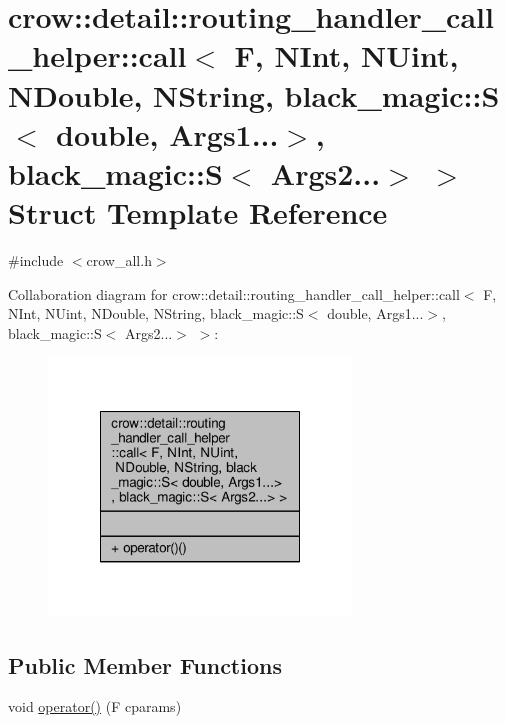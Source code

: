 \hypertarget{structcrow_1_1detail_1_1routing__handler__call__helper_1_1call_3_01_f_00_01_n_int_00_01_n_uint_0b30fc35e23f441513a63571edf36fc02}{\section{crow\-:\-:detail\-:\-:routing\-\_\-handler\-\_\-call\-\_\-helper\-:\-:call$<$ F, N\-Int, N\-Uint, N\-Double, N\-String, black\-\_\-magic\-:\-:S$<$ double, Args1...$>$, black\-\_\-magic\-:\-:S$<$ Args2...$>$ $>$ Struct Template Reference}
\label{structcrow_1_1detail_1_1routing__handler__call__helper_1_1call_3_01_f_00_01_n_int_00_01_n_uint_0b30fc35e23f441513a63571edf36fc02}
}


{\ttfamily \#include $<$crow\-\_\-all.\-h$>$}



Collaboration diagram for crow\-:\-:detail\-:\-:routing\-\_\-handler\-\_\-call\-\_\-helper\-:\-:call$<$ F, N\-Int, N\-Uint, N\-Double, N\-String, black\-\_\-magic\-:\-:S$<$ double, Args1...$>$, black\-\_\-magic\-:\-:S$<$ Args2...$>$ $>$\-:
\nopagebreak
\begin{figure}[H]
\begin{center}
\leavevmode
\includegraphics[width=228pt]{structcrow_1_1detail_1_1routing__handler__call__helper_1_1call_3_01_f_00_01_n_int_00_01_n_uint_025311c79e2b8df0956a062061ea70ff8}
\end{center}
\end{figure}
\subsection*{Public Member Functions}
\begin{DoxyCompactItemize}
\item 
void \hyperlink{structcrow_1_1detail_1_1routing__handler__call__helper_1_1call_3_01_f_00_01_n_int_00_01_n_uint_0b30fc35e23f441513a63571edf36fc02_ab84691ea1fb5e9ac0d48c8d855de8851}{operator()} (F cparams)
\end{DoxyCompactItemize}


